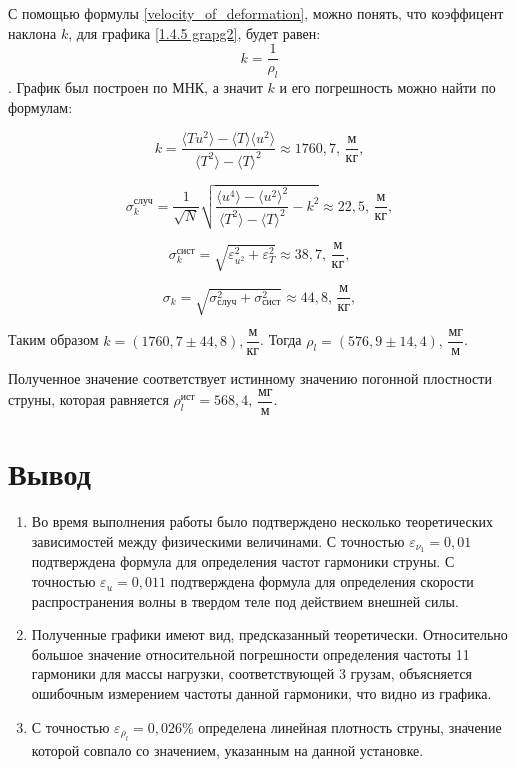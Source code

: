 \documentclass[a4paper,12pt]{article}
\begin{document}
	С помощью формулы \eqref{velocity_of_deformation}, можно понять, что коэффицент наклона $k$, для графика \ref{1.4.5 grapg2}, будет равен: $$k = \dfrac{1}{\rho_l}$$. График был построен по МНК, а значит $k$ и его погрешность можно найти по формулам:
	
	\begin{equation}
		k=\frac{\langle Tu^2\rangle-\langle T\rangle \langle u^2\rangle}{\langle T^2\rangle - \langle T\rangle^2} \approx 1760,7 \text{, $\dfrac{\text{м}}{\text{кг}}$},
	\end{equation}
	
	\begin{equation}
		\sigma_k^\text{случ}=\frac{1}{\sqrt{N}}\sqrt{\frac{\langle u^4 \rangle - \langle u^2 \rangle^2}{\langle T^2 \rangle - \langle T \rangle^2} - k^2  } \approx 22,5\text{, $\dfrac{\text{м}}{\text{кг}}$},
	\end{equation}
	
	\begin{equation}
		\sigma_k^{\text{сист}} = \sqrt{ \varepsilon_{u^2}^2 + \varepsilon_T^2 } \approx 38,7\text{, $\dfrac{\text{м}}{\text{кг}}$},
	\end{equation}
	
	\begin{equation}
		\sigma_k = \sqrt{\sigma_\text{случ}^2 + \sigma_\text{сист}^2} \approx 44,8\text{, $\dfrac{\text{м}}{\text{кг}}$},
	\end{equation}

	Таким образом $k = (1760,7 \pm 44,8) {, \dfrac{\text{м}}{\text{кг}}} $.
	Тогда \underline{ $\rho_l = (576,9 \pm 14,4) \text{, $\dfrac{\text{мг}}{\text{м}}$}$}.
	
	Полученное значение соответствует истинному значению погонной плостности струны, которая равняется $\rho^{\text{ист}}_l = 568,4\text{, $\dfrac{\text{мг}}{\text{м}}$} $. 
	\section{Вывод}
	
	\begin{enumerate}
		\item Во время выполнения работы было подтверждено несколько теоретических зависимостей между физическими величинами. С точностью $\varepsilon_{\nu_{1}} = 0,01$ подтверждена формула для определения частот гармоники струны. С точностью  $\varepsilon_{u} = 0,011$ подтверждена формула для определения скорости распространения волны в твердом теле под действием внешней силы.
		\item Полученные графики имеют вид, предсказанный теоретически. Относительно большое значение относительной погрешности определения частоты 11 гармоники для массы нагрузки, соответствующей 3 грузам, объясняется ошибочным измерением частоты данной гармоники, что видно из графика. 
		\item С точностью $ \varepsilon_{\rho_{l}} = 0,026 \%$ определена линейная плотность струны, значение которой совпало со значением, указанным на данной установке.
	\end{enumerate}
\end{document}
